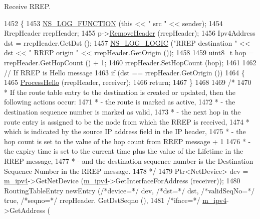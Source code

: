 Receive R\+R\+EP. 


\begin{DoxyCode}
1452 \{
1453   \hyperlink{log-macros-disabled_8h_a90b90d5bad1f39cb1b64923ea94c0761}{NS\_LOG\_FUNCTION} (\textcolor{keyword}{this} << \textcolor{stringliteral}{" src "} << sender);
1454   RrepHeader rrepHeader;
1455   p->\hyperlink{classns3_1_1Packet_a0961eccf975d75f902d40956c93ba63e}{RemoveHeader} (rrepHeader);
1456   Ipv4Address dst = rrepHeader.GetDst ();
1457   \hyperlink{group__logging_ga88acd260151caf2db9c0fc84997f45ce}{NS\_LOG\_LOGIC} (\textcolor{stringliteral}{"RREP destination "} << dst << \textcolor{stringliteral}{" RREP origin "} << rrepHeader.GetOrigin ());
1458 
1459   uint8\_t hop = rrepHeader.GetHopCount () + 1;
1460   rrepHeader.SetHopCount (hop);
1461 
1462   \textcolor{comment}{// If RREP is Hello message}
1463   \textcolor{keywordflow}{if} (dst == rrepHeader.GetOrigin ())
1464     \{
1465       \hyperlink{classns3_1_1aodv_1_1RoutingProtocol_a5535371d9e72ee97a24be5b67eef982f}{ProcessHello} (rrepHeader, receiver);
1466       \textcolor{keywordflow}{return};
1467     \}
1468 
1469   \textcolor{comment}{/*}
1470 \textcolor{comment}{   * If the route table entry to the destination is created or updated, then the following actions occur:}
1471 \textcolor{comment}{   * -  the route is marked as active,}
1472 \textcolor{comment}{   * -  the destination sequence number is marked as valid,}
1473 \textcolor{comment}{   * -  the next hop in the route entry is assigned to be the node from which the RREP is received,}
1474 \textcolor{comment}{   *    which is indicated by the source IP address field in the IP header,}
1475 \textcolor{comment}{   * -  the hop count is set to the value of the hop count from RREP message + 1}
1476 \textcolor{comment}{   * -  the expiry time is set to the current time plus the value of the Lifetime in the RREP message,}
1477 \textcolor{comment}{   * -  and the destination sequence number is the Destination Sequence Number in the RREP message.}
1478 \textcolor{comment}{   */}
1479   Ptr<NetDevice> dev = \hyperlink{classns3_1_1aodv_1_1RoutingProtocol_aee33006b1f9d8b24d4722037ff3fec98}{m\_ipv4}->GetNetDevice (\hyperlink{classns3_1_1aodv_1_1RoutingProtocol_aee33006b1f9d8b24d4722037ff3fec98}{m\_ipv4}->GetInterfaceForAddress (receiver));
1480   RoutingTableEntry newEntry (\textcolor{comment}{/*device=*/} dev, \textcolor{comment}{/*dst=*/} dst, \textcolor{comment}{/*validSeqNo=*/} \textcolor{keyword}{true}, \textcolor{comment}{/*seqno=*/} rrepHeader.
      GetDstSeqno (),
1481                                           \textcolor{comment}{/*iface=*/} \hyperlink{classns3_1_1aodv_1_1RoutingProtocol_aee33006b1f9d8b24d4722037ff3fec98}{m\_ipv4}->GetAddress (

\end{DoxyCode}
